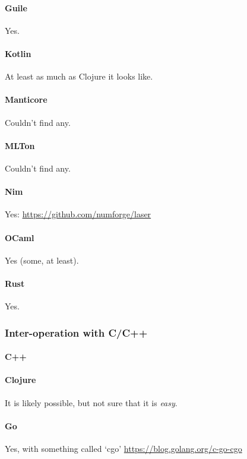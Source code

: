 \paragraph{Guile}
Yes.

\paragraph{Kotlin}
At least as much as Clojure it looks like.

\paragraph{Manticore}
Couldn't find any.

\paragraph{MLTon}
Couldn't find any.

\paragraph{Nim}
Yes: \url{https://github.com/numforge/laser}

\paragraph{OCaml}
Yes (some, at least).


\paragraph{Rust}
Yes.


\subsubsection{Inter-operation with C/C++}

\paragraph{C++}

\paragraph{Clojure}
It is likely possible, but not sure that it is \emph{easy}.

\paragraph{Go}
Yes, with something called `cgo' \url{https://blog.golang.org/c-go-cgo}

